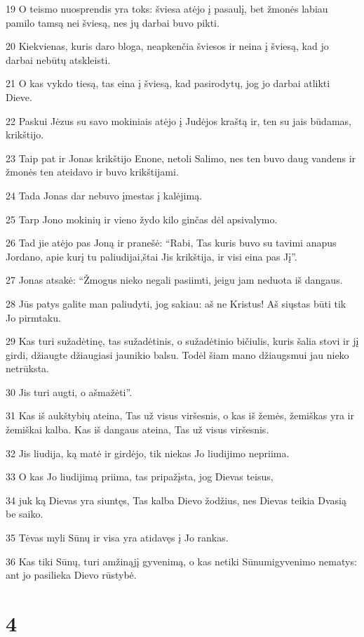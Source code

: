 \par 19 O teismo nuosprendis yra toks: šviesa atėjo į pasaulį, bet žmonės labiau pamilo tamsą nei šviesą, nes jų darbai buvo pikti. 
\par 20 Kiekvienas, kuris daro bloga, neapkenčia šviesos ir neina į šviesą, kad jo darbai nebūtų atskleisti. 
\par 21 O kas vykdo tiesą, tas eina į šviesą, kad pasirodytų, jog jo darbai atlikti Dieve. 
\par 22 Paskui Jėzus su savo mokiniais atėjo į Judėjos kraštą ir, ten su jais būdamas, krikštijo. 
\par 23 Taip pat ir Jonas krikštijo Enone, netoli Salimo, nes ten buvo daug vandens ir žmonės ten ateidavo ir buvo krikštijami. 
\par 24 Tada Jonas dar nebuvo įmestas į kalėjimą. 
\par 25 Tarp Jono mokinių ir vieno žydo kilo ginčas dėl apsivalymo. 
\par 26 Tad jie atėjo pas Joną ir pranešė: “Rabi, Tas kuris buvo su tavimi anapus Jordano, apie kurį tu paliudijai,­štai Jis krikštija, ir visi eina pas Jį”. 
\par 27 Jonas atsakė: “Žmogus nieko negali pasiimti, jeigu jam neduota iš dangaus. 
\par 28 Jūs patys galite man paliudyti, jog sakiau: aš ne Kristus! Aš siųstas būti tik Jo pirmtaku. 
\par 29 Kas turi sužadėtinę, tas sužadėtinis, o sužadėtinio bičiulis, kuris šalia stovi ir jį girdi, džiaugte džiaugiasi jaunikio balsu. Todėl šiam mano džiaugsmui jau nieko netrūksta. 
\par 30 Jis turi augti, o aš­mažėti”. 
\par 31 Kas iš aukštybių ateina, Tas už visus viršesnis, o kas iš žemės,­ žemiškas yra ir žemiškai kalba. Kas iš dangaus ateina, Tas už visus viršesnis. 
\par 32 Jis liudija, ką matė ir girdėjo, tik niekas Jo liudijimo nepriima. 
\par 33 O kas Jo liudijimą priima, tas pripažįsta, jog Dievas teisus, 
\par 34 juk ką Dievas yra siuntęs, Tas kalba Dievo žodžius, nes Dievas teikia Dvasią be saiko. 
\par 35 Tėvas myli Sūnų ir visa yra atidavęs į Jo rankas. 
\par 36 Kas tiki Sūnų, turi amžinąjį gyvenimą, o kas netiki Sūnumi­gyvenimo nematys: ant jo pasilieka Dievo rūstybė.


\chapter{4}



